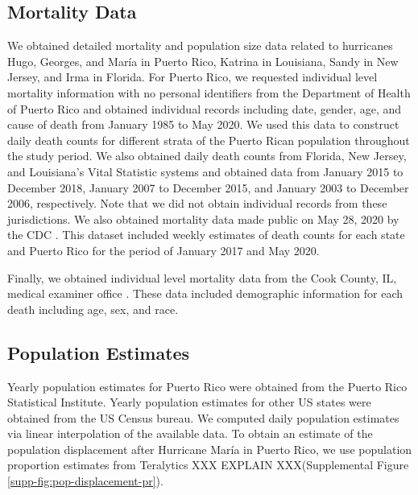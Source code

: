 \documentclass[11pt]{article}
\begin{document}
\subsection{Mortality Data}
\label{subsec:mortality-data}
We obtained detailed mortality and population size data related to hurricanes Hugo, Georges, and Mar\'ia in Puerto Rico, Katrina in Louisiana, Sandy in New Jersey, and Irma in Florida. For Puerto Rico, we requested individual level mortality information with no personal identifiers from the Department of Health of Puerto Rico and obtained individual records including date, gender, age, and cause of death from January 1985 to May 2020. We used this data to construct daily death counts for different strata of the Puerto Rican population throughout the study period. We also obtained daily death counts from Florida, New Jersey, and Louisiana’s Vital Statistic systems and obtained data from January 2015 to December 2018, January 2007 to December 2015, and January 2003 to December 2006, respectively. Note that we did not obtain individual records from these jurisdictions. We also obtained mortality data made public on May 28, 2020 by the CDC  \cite{cdc2020covid19}. This dataset included weekly estimates of death counts for each state and Puerto Rico for the period of January 2017 and May 2020. 

Finally, we obtained individual level mortality data from the Cook County, IL, medical examiner office \cite{cookcovid19}. These data included demographic information for each death including age, sex, and race.

\subsection{Population Estimates}
\label{subsec:population}
Yearly population estimates for Puerto Rico were obtained from the Puerto Rico Statistical Institute. Yearly population estimates for other US states were obtained from the US Census bureau. We computed daily population estimates via linear interpolation of the available data. To obtain an estimate of the population displacement after Hurricane Mar\'ia in Puerto Rico, we use population proportion estimates from Teralytics XXX EXPLAIN XXX(Supplemental Figure \ref{supp-fig:pop-displacement-pr}).
\end{document}

